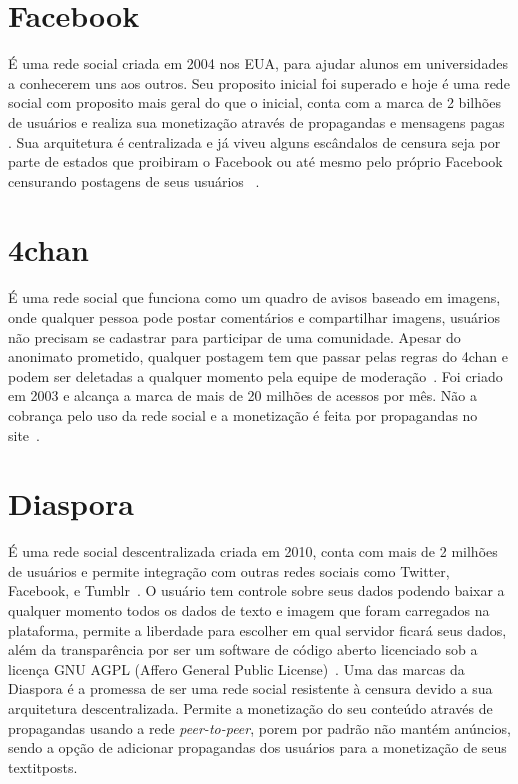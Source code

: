 \section{Facebook}

É uma rede social criada em 2004 nos EUA, para ajudar alunos em universidades a conhecerem uns aos outros.
Seu proposito inicial foi superado e hoje é uma rede social com proposito mais geral do que o inicial,
conta com a marca de 2 bilhões de usuários e realiza sua monetização através de propagandas e mensagens pagas~\cite{Facebook1} \cite{Facebook2}.
Sua arquitetura é centralizada e já viveu alguns escândalos de censura seja por parte de estados que proibiram o Facebook ou até mesmo pelo próprio Facebook censurando postagens de seus usuários~\cite{Facebook4} \cite{Facebook5}.

\section{4chan}

É uma rede social que funciona como um quadro de avisos baseado em imagens, onde qualquer pessoa pode postar comentários e compartilhar imagens, usuários não precisam se cadastrar para participar de uma comunidade.
Apesar do anonimato prometido, qualquer postagem tem que passar pelas regras do 4chan e podem ser deletadas a qualquer momento pela equipe de moderação~\cite{4chan1}.
Foi criado em 2003 e alcança a marca de mais de 20 milhões de acessos por mês. Não a cobrança pelo uso da rede social e a monetização é feita por propagandas no site~\cite{4chan2}.

\section{Diaspora}

É uma rede social descentralizada criada em 2010, conta com mais de 2 milhões de usuários e permite integração com outras redes sociais como Twitter, Facebook, e Tumblr~\cite{Diaspora1}.
O usuário tem controle sobre seus dados podendo baixar a qualquer momento todos os dados de texto e imagem que foram carregados na plataforma, permite a liberdade para escolher em qual servidor ficará seus dados, além da transparência por ser um software de código aberto licenciado sob a licença GNU AGPL (Affero General Public License)~\cite{Diaspora2}. 
Uma das marcas da Diaspora é a promessa de ser uma rede social resistente à censura devido a sua arquitetura descentralizada.
Permite a monetização do seu conteúdo através de propagandas usando a rede \textit{peer-to-peer}, porem por padrão não mantém anúncios, sendo a opção de adicionar propagandas dos usuários para a monetização de seus textit{posts}.

